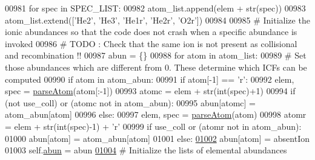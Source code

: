 \begin{DoxyCode}
00981             \textcolor{keywordflow}{for} spec \textcolor{keywordflow}{in} SPEC\_LIST:
00982                 atom\_list.append(elem + str(spec)) 
00983         atom\_list.extend([\textcolor{stringliteral}{'He2'}, \textcolor{stringliteral}{'He3'}, \textcolor{stringliteral}{'He1r'}, \textcolor{stringliteral}{'He2r'}, \textcolor{stringliteral}{'O2r'}])
00984     
00985         \textcolor{comment}{# Initialize the ionic abundances so that the code does not crash when a specific abundance is
       invoked}
00986         \textcolor{comment}{# TODO : Check that the same ion is not present as collisional and recombination !!}
00987         abun = \{\}
00988         \textcolor{keywordflow}{for} atom \textcolor{keywordflow}{in} atom\_list:
00989             \textcolor{comment}{# Set those abundances which are different from 0. These determine which ICFs can be computed  
            }
00990             \textcolor{keywordflow}{if} atom \textcolor{keywordflow}{in} atom\_abun:
00991                 \textcolor{keywordflow}{if} atom[-1] == \textcolor{stringliteral}{'}\textcolor{stringliteral}{r':}
00992 \textcolor{stringliteral}{                    elem, spec = \hyperlink{namespacepyneb_1_1utils_1_1misc_a2bb6f906a75f26a882093e9ce9272507}{parseAtom}(atom[:-1])}
00993 \textcolor{stringliteral}{                    atomc = elem + str(int(spec)+1)}
00994 \textcolor{stringliteral}{                    }\textcolor{keywordflow}{if} (\textcolor{keywordflow}{not} use\_coll) \textcolor{keywordflow}{or} (atomc \textcolor{keywordflow}{not} \textcolor{keywordflow}{in} atom\_abun):
00995                         abun[atomc] = atom\_abun[atom]
00996                 \textcolor{keywordflow}{else}:
00997                     elem, spec = \hyperlink{namespacepyneb_1_1utils_1_1misc_a2bb6f906a75f26a882093e9ce9272507}{parseAtom}(atom)
00998                     atomr = elem + str(int(spec)-1) + \textcolor{stringliteral}{'}\textcolor{stringliteral}{r'}
00999 \textcolor{stringliteral}{                    }\textcolor{keywordflow}{if} use\_coll \textcolor{keywordflow}{or} (atomr \textcolor{keywordflow}{not} \textcolor{keywordflow}{in} atom\_abun):
01000                         abun[atom] = atom\_abun[atom]
01001             \textcolor{keywordflow}{else}:
\hypertarget{classpyneb_1_1core_1_1icf_1_1_i_c_f_l01002}{}\hyperlink{classpyneb_1_1core_1_1icf_1_1_i_c_f_a16f31533c8f77e2b08988b22df5317b1}{01002}                 abun[atom] = absentIon
01003         self.\hyperlink{classpyneb_1_1core_1_1icf_1_1_i_c_f_a16f31533c8f77e2b08988b22df5317b1}{abun} = abun
\hypertarget{classpyneb_1_1core_1_1icf_1_1_i_c_f_l01004}{}\hyperlink{classpyneb_1_1core_1_1icf_1_1_i_c_f_a9dedc0eb2ad90ea08b8be9984e2d832b}{01004}         \textcolor{comment}{# Initialize the lists of elemental abundances}

\end{DoxyCode}
